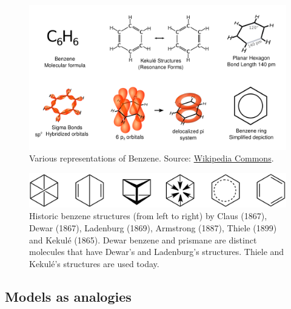 \documentclass[
]{book}
\begin{document}
\begin{figure}[hbtp]

{\centering \includegraphics[width=0.9\linewidth]{Figures/Benzene_Representations} 

}

\caption{Various representations of Benzene. Source: \href{https://en.wikipedia.org/wiki/File:Benzene_Representations.svg}{Wikipedia Commons}.}\label{fig:benzene-model}
\end{figure}



\begin{figure}[hbtp]

{\centering \includegraphics[width=0.9\linewidth]{Figures/Historic_Benzene_Formulae} 

}

\caption{Historic benzene structures (from left to right) by Claus (1867), Dewar (1867), Ladenburg (1869), Armstrong (1887), Thiele (1899) and Kekulé (1865). Dewar benzene and prismane are distinct molecules that have Dewar's and Ladenburg's structures. Thiele and Kekulé's structures are used today.}\label{fig:benzene-model-evolution}
\end{figure}

\hypertarget{models-as-analogies}{%
\subsection{Models as analogies}\label{models-as-analogies}}
\end{document}

